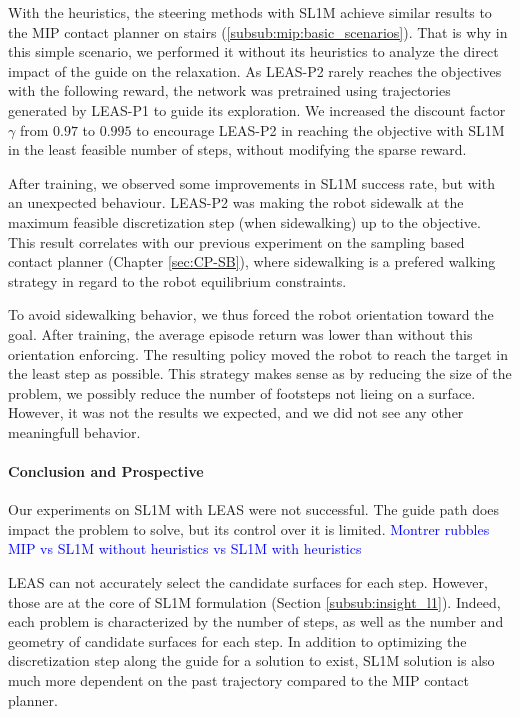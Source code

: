 With the heuristics, the steering methods with SL1M achieve similar results to the MIP contact planner on stairs (\ref{subsub:mip:basic_scenarios}).
That is why in this simple scenario, we performed it without its heuristics to analyze the direct impact of the guide on the relaxation.
As LEAS-P2 rarely reaches the objectives with the following reward, the network was pretrained using trajectories generated by LEAS-P1 to guide its exploration.
We increased the discount factor $\gamma$ from $0.97$ to $0.995$ to encourage LEAS-P2 in reaching the objective with SL1M in the least feasible number of steps, without modifying the sparse reward.

After training, we observed some improvements in SL1M success rate, but with an unexpected behaviour.
LEAS-P2 was making the robot sidewalk at the maximum feasible discretization step (when sidewalking) up to the objective.
This result correlates with our previous experiment on the sampling based contact planner (Chapter \ref{sec:CP-SB}), where sidewalking is a prefered walking strategy in regard to the robot equilibrium constraints.

To avoid sidewalking behavior, we thus forced the robot orientation toward the goal.
After training, the average episode return was lower than without this orientation enforcing.
The resulting policy moved the robot to reach the target in the least step as possible.
This strategy makes sense as by reducing the size of the problem, we possibly reduce the number of footsteps not lieing on a surface.
However, it was not the results we expected, and we did not see any other meaningfull behavior.

\paragraph{Conclusion and Prospective}

Our experiments on SL1M with LEAS were not successful.
The guide path does impact the problem to solve, but its control over it is limited.
\textcolor{blue}{Montrer rubbles MIP vs SL1M without heuristics vs SL1M with heuristics}

LEAS can not accurately select the candidate surfaces for each step. However, those are at the core of SL1M formulation (Section \ref{subsub:insight_l1}). 
Indeed, each problem is characterized by the number of steps, as well as the number and geometry of candidate surfaces for each step.
In addition to optimizing the discretization step along the guide for a solution to exist, SL1M solution is also much more dependent on the past trajectory compared to the MIP contact planner.

